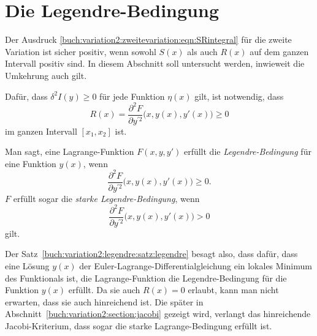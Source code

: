 %
%
%
\section{Die Legendre-Bedingung
\label{buch:variation2:section:legendre}}
Der Ausdruck \eqref{buch:variation2:zweitevariation:eqn:SRintegral}
für die zweite Variation ist sicher positiv, wenn sowohl $S(x)$
als auch $R(x)$ auf dem ganzen Intervall positiv sind.
In diesem Abschnitt soll untersucht werden, inwieweit die
Umkehrung auch gilt.

\begin{satz}[Legendre]
\label{buch:variation2:legendre:satz:legendre}
Dafür, dass $\delta^2I(y)\ge 0$ für jede Funktion $\eta(x)$ gilt, ist
notwendig, dass
\[
R(x)
=
\frac{\partial^2F}{\partial y^{\prime 2}}\bigl(x,y(x),y'(x)\bigr)
\ge
0
\]
im ganzen Intervall $[x_1,x_2]$ ist.
\end{satz}

\begin{definition}
Man sagt, eine Lagrange-Funktion $F(x,y,y')$ erfüllt die
{\em Legendre-Bedingung}
%
für eine Funktion $y(x)$, wenn 
\[
\frac{\partial^2 F}{\partial y^{\prime 2}}\bigl(x,y(x),y'(x)\bigr) \ge 0.
\]
$F$ erfüllt sogar die {\em starke Legendre-Bedingung}, wenn
%
\[
\frac{\partial^2 F}{\partial y^{\prime 2}}\bigl(x,y(x),y'(x)\bigr) > 0
\]
gilt.
\end{definition}

Der Satz~\ref{buch:variation2:legendre:satz:legendre} besagt also,
dass dafür, dass eine Lösung $y(x)$ der
Euler-Lagrange-Diffe\-ren\-tial\-gleichung
ein lokales Minimum des Funktionals ist, die Lagrange-Funktion
die Legendre-Bedingung für die Funktion $y(x)$ erfüllt.
Da sie auch $R(x)=0$ erlaubt, kann man nicht erwarten, dass sie auch
hinreichend ist.
Die später in Abschnitt~\ref{buch:variation2:section:jacobi} gezeigt wird,
verlangt das hinreichende Jacobi-Kriterium, dass sogar die starke
Lagrange-Bedingung erfüllt ist.

